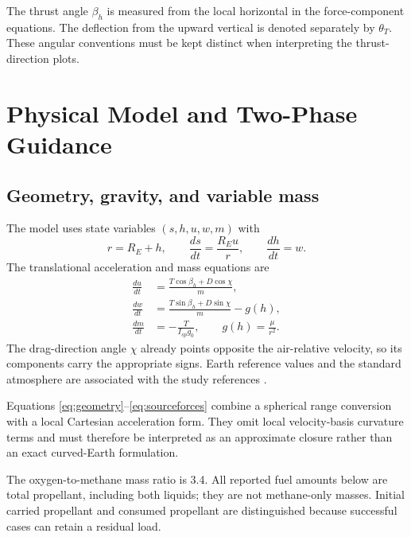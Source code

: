 \documentclass[11pt,a4paper]{article}
\begin{document}
The thrust angle $\beta_h$ is measured from the local horizontal in the force-component equations. The deflection from the upward vertical is denoted separately by $\theta_T$. These angular conventions must be kept distinct when interpreting the thrust-direction plots.

\section{Physical Model and Two-Phase Guidance}
\subsection{Geometry, gravity, and variable mass}
The model uses state variables $(s,h,u,w,m)$ with
\begin{equation}
 r=R_E+h,\qquad \frac{ds}{dt}=\frac{R_Eu}{r},\qquad \frac{dh}{dt}=w.
\label{eq:geometry}
\end{equation}
The translational acceleration and mass equations are
\begin{align}
 \frac{du}{dt}&=\frac{T\cos\beta_h+D\cos\chi}{m},\\
 \frac{dw}{dt}&=\frac{T\sin\beta_h+D\sin\chi}{m}-g(h),\\
 \frac{dm}{dt}&=-\frac{T}{I_{sp}g_0},\qquad
 g(h)=\frac{\mu}{r^2}.
\label{eq:sourceforces}
\end{align}
The drag-direction angle $\chi$ already points opposite the air-relative velocity, so its components carry the appropriate signs. Earth reference values and the standard atmosphere are associated with the study references \cite{ussa,earth,iers}.

Equations \eqref{eq:geometry}--\eqref{eq:sourceforces} combine a spherical range conversion with a local Cartesian acceleration form. They omit local velocity-basis curvature terms and must therefore be interpreted as an approximate closure rather than an exact curved-Earth formulation.

The oxygen-to-methane mass ratio is 3.4. All reported fuel amounts below are total propellant, including both liquids; they are not methane-only masses. Initial carried propellant and consumed propellant are distinguished because successful cases can retain a residual load.
\end{document}
